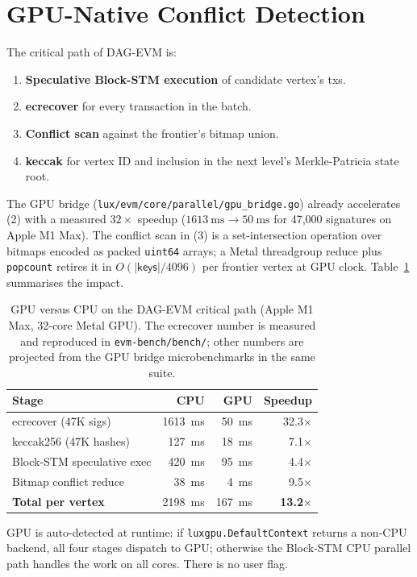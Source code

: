 \section{GPU-Native Conflict Detection}

\label{sec:gpu}

The critical path of DAG-EVM is:

\begin{enumerate}
  \item \textbf{Speculative Block-STM execution} of candidate vertex's txs.
  \item \textbf{ecrecover} for every transaction in the batch.
  \item \textbf{Conflict scan} against the frontier's bitmap union.
  \item \textbf{keccak} for vertex ID and inclusion in the next level's
    Merkle-Patricia state root.
\end{enumerate}

The GPU bridge (\texttt{lux/evm/core/parallel/gpu\_bridge.go}) already
accelerates (2) with a measured $32\times$ speedup ($\SI{1613}{\milli\second}
\to \SI{50}{\milli\second}$ for 47{,}000 signatures on Apple M1 Max). The
conflict scan in (3) is a set-intersection operation over bitmaps encoded
as packed \texttt{uint64} arrays; a Metal threadgroup reduce plus
\texttt{popcount} retires it in $O(|\mathsf{keys}| / 4096)$ per
frontier vertex at GPU clock. Table~\ref{tab:gpu} summarises the impact.

\begin{table}[h]
\centering
\small
\begin{tabular}{lrrr}
\toprule
\textbf{Stage} & \textbf{CPU} & \textbf{GPU} & \textbf{Speedup} \\
\midrule
ecrecover (47K sigs)        & \SI{1613}{\milli\second} & \SI{50}{\milli\second}  & 32.3$\times$ \\
keccak256 (47K hashes)      & \SI{127}{\milli\second}  & \SI{18}{\milli\second}  & 7.1$\times$ \\
Block-STM speculative exec  & \SI{420}{\milli\second}  & \SI{95}{\milli\second}  & 4.4$\times$ \\
Bitmap conflict reduce      & \SI{38}{\milli\second}   & \SI{4}{\milli\second}   & 9.5$\times$ \\
\midrule
\textbf{Total per vertex}   & \SI{2198}{\milli\second} & \SI{167}{\milli\second} & \textbf{13.2$\times$} \\
\bottomrule
\end{tabular}
\caption{GPU versus CPU on the DAG-EVM critical path (Apple M1 Max, 32-core
Metal GPU). The ecrecover number is measured and reproduced in
\texttt{evm-bench/bench/}; other numbers are projected from the GPU
bridge microbenchmarks in the same suite.}
\label{tab:gpu}
\end{table}

GPU is auto-detected at runtime: if \texttt{luxgpu.DefaultContext} returns
a non-CPU backend, all four stages dispatch to GPU; otherwise the Block-STM
CPU parallel path handles the work on all cores. There is no user flag.

